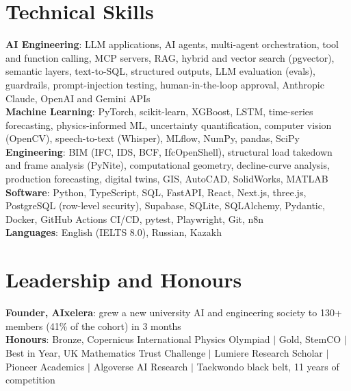 \documentclass[a4paper,10pt]{article}
\begin{document}
\section{Technical Skills}
 \begin{itemize}[leftmargin=0.12in, label={}, topsep=2pt]
    \small{\item{
     \textbf{AI Engineering}{: LLM applications, AI agents, multi-agent orchestration, tool and function calling, MCP servers, RAG, hybrid and vector search (pgvector), semantic layers, text-to-SQL, structured outputs, LLM evaluation (evals), guardrails, prompt-injection testing, human-in-the-loop approval, Anthropic Claude, OpenAI and Gemini APIs} \\
     \textbf{Machine Learning}{: PyTorch, scikit-learn, XGBoost, LSTM, time-series forecasting, physics-informed ML, uncertainty quantification, computer vision (OpenCV), speech-to-text (Whisper), MLflow, NumPy, pandas, SciPy} \\
     \textbf{Engineering}{: BIM (IFC, IDS, BCF, IfcOpenShell), structural load takedown and frame analysis (PyNite), computational geometry, decline-curve analysis, production forecasting, digital twins, GIS, AutoCAD, SolidWorks, MATLAB} \\
     \textbf{Software}{: Python, TypeScript, SQL, FastAPI, React, Next.js, three.js, PostgreSQL (row-level security), Supabase, SQLite, SQLAlchemy, Pydantic, Docker, GitHub Actions CI/CD, pytest, Playwright, Git, n8n} \\
     \textbf{Languages}{: English (IELTS 8.0), Russian, Kazakh}
    }}
 \end{itemize}
 \vspace{-9pt}

\section{Leadership and Honours}
 \begin{itemize}[leftmargin=0.12in, label={}, topsep=2pt]
    \small{\item{
     \textbf{Founder, AIxelera}{: grew a new university AI and engineering society to 130+ members (41\% of the cohort) in 3 months} \\
     \textbf{Honours}{: Bronze, Copernicus International Physics Olympiad $|$ Gold, StemCO $|$ Best in Year, UK Mathematics Trust Challenge $|$ Lumiere Research Scholar $|$ Pioneer Academics $|$ Algoverse AI Research $|$ Taekwondo black belt, 11 years of competition}
    }}
 \end{itemize}
\end{document}
